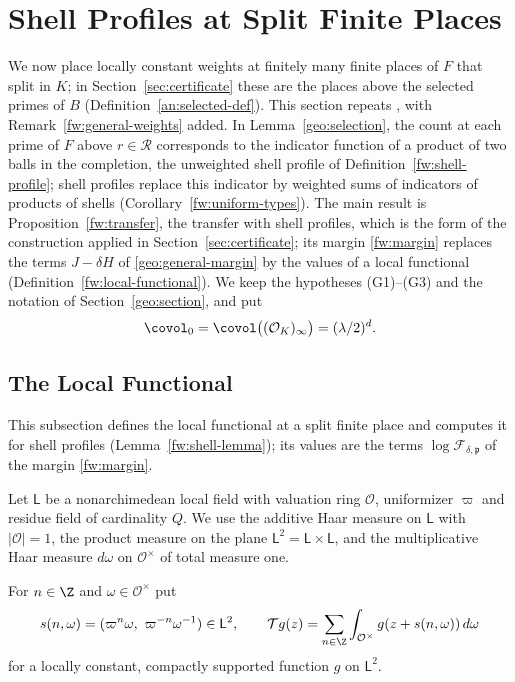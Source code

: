 \section{Shell Profiles at Split Finite Places}
\label{fw:section}

We now place locally constant weights at finitely many finite places of
$F$ that split in $K$; in Section~\ref{sec:certificate} these are the
places above the selected primes of $B$ (Definition~\ref{an:selected-def}).
This section repeats \cite[Section~6]{Naslund04273}, with
Remark~\ref{fw:general-weights} added. In
Lemma~\ref{geo:selection}, the count at each prime of $F$ above
$r\in\mathcal R$ corresponds to the indicator function of a product of
two balls in the completion, the unweighted shell profile of
Definition~\ref{fw:shell-profile}; shell profiles replace this indicator
by weighted sums of indicators of products of shells
(Corollary~\ref{fw:uniform-types}). The main result is
Proposition~\ref{fw:transfer}, the transfer with shell profiles, which is the
form of the construction applied in Section~\ref{sec:certificate}; its
margin \eqref{fw:margin} replaces the terms $J-\delta H$ of
\eqref{geo:general-margin} by the values of a local functional
(Definition~\ref{fw:local-functional}). We keep the hypotheses (G1)--(G3)
and the notation of Section~\ref{geo:section}, and put
\[
 \covol_0=\covol\bigl((\mathcal O_K)_\infty\bigr)=(\lambda/2)^d .
\]

\subsection{The Local Functional}\label{fw:local-subsection}

This subsection defines the local functional at a split finite place and
computes it for shell profiles (Lemma~\ref{fw:shell-lemma}); its values are
the terms $\log\mathcal F_{\delta,\mathfrak p}$ of the margin
\eqref{fw:margin}.

Let $\mathsf L$ be a nonarchimedean local field with valuation ring $\mathcal
O$, uniformizer $\varpi$ and residue field of cardinality $Q$. We use
the additive Haar measure on $\mathsf L$ with $|\mathcal O|=1$, the product
measure on the plane $\mathsf L^2=\mathsf L\times\mathsf L$, and the
multiplicative Haar measure $d\omega$ on $\mathcal O^\times$ of total
measure one.

\begin{definition}\label{fw:shift-operator}
For $n\in\Z$ and $\omega\in\mathcal O^\times$ put
\[
 s(n,\omega)=(\varpi^n\omega,\ \varpi^{-n}\omega^{-1})\in\mathsf L^2,\qquad
 \mathcal Tg(z)=\sum_{n\in\Z}\int_{\mathcal O^\times}g(z+s(n,\omega))\,d\omega
\]
for a locally constant, compactly supported function $g$ on $\mathsf L^2$.
\end{definition}

